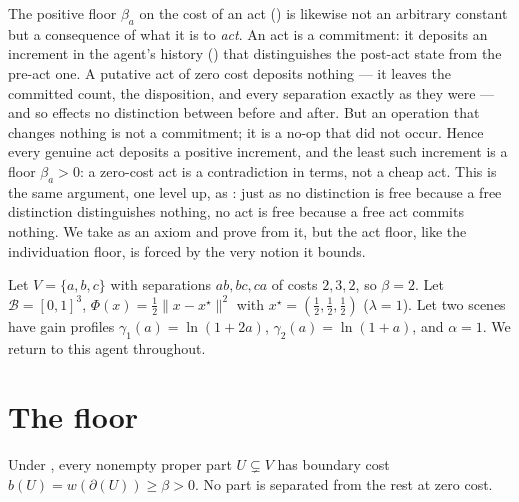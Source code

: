 \documentclass[11pt,twocolumn,a4paper]{article}
\newcommand{\V}{V}
\newcommand{\wt}{w}
\newcommand{\floorc}{\beta}          %
\newcommand{\cut}{\partial}
\newcommand{\Beh}{\mathcal{B}}       %
\newcommand{\drive}{\Phi}            %
\newcommand{\lam}{\lambda}
\newcommand{\Purp}{x^{\star}}        %
\newcommand{\att}{\alpha}            %
\newcommand{\norm}[1]{\lVert#1\rVert}
\begin{document}
\begin{remark}
\label{rem:actfloor-earned}
The positive floor $\floorc_a$ on the cost of an act
() is likewise not an arbitrary constant but a
consequence of what it is to \emph{act}. An act is a commitment: it
deposits an increment in the agent's history () that
distinguishes the post-act state from the pre-act one. A putative act of
zero cost deposits nothing --- it leaves the committed count, the
disposition, and every separation exactly as they were --- and so effects
no distinction between before and after. But an operation that changes
nothing is not a commitment; it is a no-op that did not occur. Hence every
genuine act deposits a positive increment, and the least such increment is
a floor $\floorc_a>0$: a zero-cost act is a contradiction in terms, not a
cheap act. This is the same argument, one level up, as
: just as no distinction is free because a free
distinction distinguishes nothing, no act is free because a free act
commits nothing. We take  as an axiom and prove from it,
but the act floor, like the individuation floor, is forced by the very
notion it bounds.
\end{remark}

\begin{example}
\label{ex:running}
Let $\V=\{a,b,c\}$ with separations $ab,bc,ca$ of costs $2,3,2$, so
$\floorc=2$. Let $\Beh=[0,1]^3$, $\drive(x)=\tfrac12\norm{x-\Purp}^2$ with
$\Purp=(\tfrac12,\tfrac12,\tfrac12)$ ($\lam=1$). Let two scenes have
gain profiles $\gamma_1(a)=\ln(1+2a)$, $\gamma_2(a)=\ln(1+a)$, and
$\att=1$. We return to this agent throughout.
\end{example}

\section{The floor}
\label{sec:floor}

\begin{theorem}[Floor]
\label{thm:floor}
Under , every nonempty proper part
$U\subsetneq\V$ has boundary cost $b(U)=\wt(\cut(U))\ge\floorc>0$. No part
is separated from the rest at zero cost.
\end{theorem}
\end{document}
